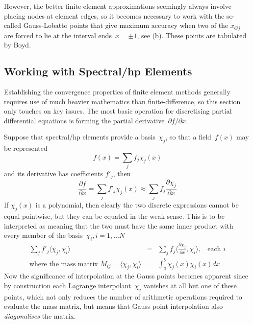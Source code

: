 However, the better finite element approximations seemingly always
involve placing nodes at element edges, so it becomes necessary to work
with the so-called Gauss-Lobatto points that give maximum accuracy when two of
the $x_{Gj}$ are forced to lie at the interval ends~$x=\pm 1$,
see (b).  These points
are tabulated by Boyd. %

\clearpage
\subsection{Working with Spectral/hp Elements}\label{sec:semwork}
Establishing the convergence properties of finite element methods generally requires use of
much heavier mathematics than finite-difference, so this section only touches on key
issues. The most basic operation for discretising partial differential equations
is forming the partial derivative~$\partial f/\partial x$.

Suppose that spectral/hp
elements provide a basis~$\chi_j$, so that a field~$f(x)$ may be represented
\begin{equation}
f(x) = \sum_j f_j \chi_j(x)
\end{equation}
and its derivative has coefficients $f'_j$, then 
\begin{equation}
 \frac{\partial f}{\partial x}= \sum_j f'_j \chi_j(x) \approx \sum_j f_j \frac{\partial \chi_j}{\partial x}
\end{equation}
If $\chi_j(x)$ is a polynomial, then clearly the two discrete expressions
cannot be equal pointwise, but they can be equated in the weak sense.
This is to be interpreted as meaning that the two must have the same
inner product with every member of the basis~$\chi_i, i=1,\ldots N$
\begin{eqnarray}\label{eq:weakdx}
\sum_j f'_j \langle \chi_j, \chi_i \rangle & = & \sum_j f_j \langle \frac{\partial \chi_j}{\partial x}, \chi_i \rangle, \;\; \mbox{ each } i\\
\mbox{where the mass matrix } M_{ij}=\langle \chi_j, \chi_i \rangle & = &  \int_{a}^{b} \chi_j(x) \chi_i(x) dx
\label{eq:inprod}
\end{eqnarray}
Now the significance of interpolation at the Gauss points becomes apparent
since by construction each Lagrange interpolant~$\chi_j$  vanishes at all but one
of these points, which not only reduces
the number of arithmetic operations required to evaluate the mass matrix,
but means that Gauss point interpolation also \emph{diagonalises} the matrix.

